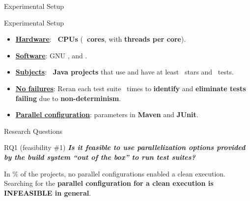 \documentclass{beamer}
\begin{document}
\begingroup
\renewcommand{\disp}{}
\begin{frame}
	\begin{center}
		Experimental Setup
	\end{center}
\end{frame}
\endgroup
\addtocounter{framenumber}{-1}

\begin{frame}{Experimental Setup}
	\begin{itemize}
		\item{\textbf{\underline{Hardware}}: \textbf{\rsm \NumCPUs\ CPUs} (\textbf{\rsm \NumCores\ cores}, with \textbf{ threads per core}).}\pause
		\item{\textbf{\underline{Software}}: GNU \textbf{} \BashVersion, and \textbf{} \MavenVersion.}\pause
		\item{\textbf{\underline{Subjects}}: \textbf{\rsm \NumProjects\ Java projects} that use \textbf{} and have at least \NumStars\ stars and \NumTests\ tests.}\pause
		\item{\textbf{\underline{No failures}}: Reran each test suite \NumRepeatsManifest\ times to \textbf{\rsm identify} and \textbf{\rsm eliminate tests failing} due to \textbf{\rsm non-determinism}.}\pause
		\item{\textbf{\underline{Parallel configuration}}: parameters in \textbf{\rsm Maven} and \textbf{\rsm JUnit}.}
	\end{itemize}
\end{frame}

\begingroup
\renewcommand{\disp}{}
\begin{frame}
	\begin{center}
		Research Questions
	\end{center}
\end{frame}
\endgroup
\addtocounter{framenumber}{-1}

\begin{frame}{RQ1 (feasibility \#1)}
	\textbf{\textit{Is it {\rsm feasible to use parallelization} options provided by the build system ``{\rsm out of the box}'' to run test suites?}}\pause
	\begin{center}
		\begin{tcolorbox}
			In \NumProjectsParExecFailsPercentage\% of the projects, no parallel configurations enabled a clean execution. Searching for the {\color{red}\textbf{parallel configuration for a clean execution is INFEASIBLE in general}}.
		\end{tcolorbox}
	\end{center}
\end{frame}
\end{document}

